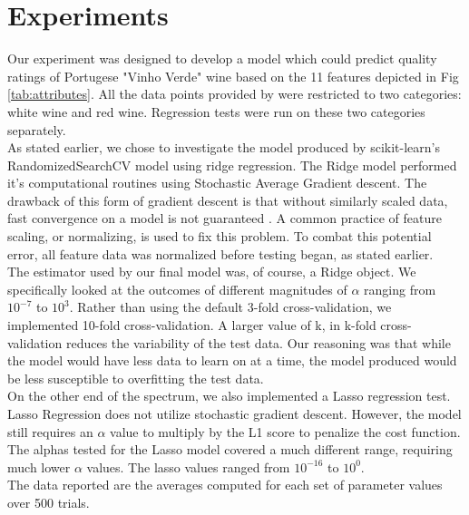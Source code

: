 
\section{Experiments}
\label{sec:expts}

Our experiment was designed to develop a model which could predict
quality ratings of Portugese "Vinho Verde" wine based on the 11 features
depicted in Fig \ref{tab:attributes}. All the data points provided by \cite{wine} 
were restricted to two categories: white wine and red wine. Regression tests were
run on these two categories separately. \\

 As stated earlier, we chose to investigate the model produced by 
 scikit-learn's RandomizedSearchCV model using ridge regression. 
 The Ridge model performed it's computational routines using Stochastic
 Average Gradient descent. The drawback of this form of gradient descent 
 is that without similarly scaled data, fast convergence on a model is not
 guaranteed \cite{scikit}. A common practice of feature scaling, or normalizing, is used 
 to fix this problem. To combat this potential error, all feature data was normalized 
 before testing began, as stated earlier. \\
 
 The estimator used by our final model was, of course, a Ridge object. 
 We specifically looked at the outcomes of different magnitudes of
 $\alpha$ ranging from $10^{-7}$ to $10^{3}$. Rather than using the default
 3-fold cross-validation, we implemented 10-fold cross-validation. A larger 
 value of k, in k-fold cross-validation reduces the variability of the test data.
 Our reasoning was that while the model would have less data to learn
 on at a time, the model produced would be less susceptible to overfitting
 the test data. \\
 
On the other end of the spectrum, we also implemented a Lasso regression test. Lasso Regression does not utilize stochastic gradient descent. However, the model still requires an $\alpha$ value to multiply by the L1 score to penalize the cost function. The alphas tested for the Lasso model covered a much different range, requiring much lower $\alpha$ values. The lasso values ranged from $10^{-16}$ to $10^{0}$.\\
 
The data reported are the averages computed for each set of 
parameter values over 500 trials.
